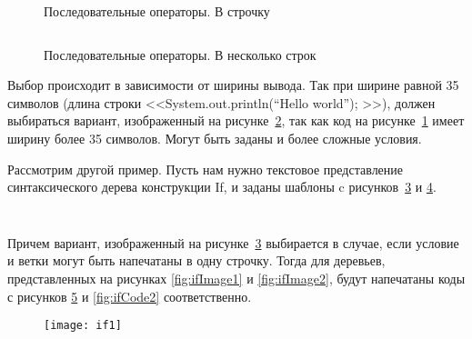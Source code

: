 \begin{figure}[h]
	\inputminted{c}{codes/seqCode1.java}
	\caption{Последовательные операторы. В строчку}
	\label{fig:seqCode1}
\end{figure}

\begin{figure}[h]
	\inputminted{c}{codes/seqCode2.java}
	\caption{Последовательные операторы. В несколько строк}
	\label{fig:seqCode2}
\end{figure}

Выбор происходит в зависимости от ширины вывода. Так при ширине равной 35 символов (длина строки <<System.out.println(“Hello world”); >>), должен выбираться вариант, изображенный на рисунке~\ref{fig:seqCode2}, так как код на рисунке~\ref{fig:seqCode1} имеет ширину более 35 символов.
Могут быть заданы и более сложные условия.

\newpage

Рассмотрим другой пример. Пусть нам нужно текстовое представление синтаксического дерева конструкции If, и заданы шаблоны c рисунков~\ref{fig:ifTemplate1} и \ref{fig:ifTemplate2}.

\begin{figure}[h]
	\inputminted{haskell}{codes/ifTemplate1.hs}
	\caption{}
	\label{fig:ifTemplate1}
\end{figure}

\begin{figure}[h]
	\inputminted{haskell}{codes/ifTemplate2.hs}
	\caption{}
	\label{fig:ifTemplate2}
\end{figure}

Причем вариант, изображенный на рисунке~\ref{fig:ifTemplate1} выбирается в случае, если условие и ветки могут быть напечатаны в одну строчку. Тогда для деревьев, представленных на рисунках \ref{fig:ifImage1} и \ref{fig:ifImage2}, будут напечатаны коды с рисунков \ref{fig:ifCode1} и \ref{fig:ifCode2} соответственно.

\begin{figure}[h!]
	\begin{minipage}[b]{0.65\linewidth}
		\centering
		\texttt{[image: if1]}
		\caption{}
		\label{fig:ifImage1}
	\end{minipage}
	\hspace{0.5cm}
	\begin{minipage}[b]{0.25\linewidth}
		\centering
		\inputminted{haskell}{codes/ifCode1.hs}
		\caption{}
		\label{fig:ifCode1}
	\end{minipage}
\end{figure}

